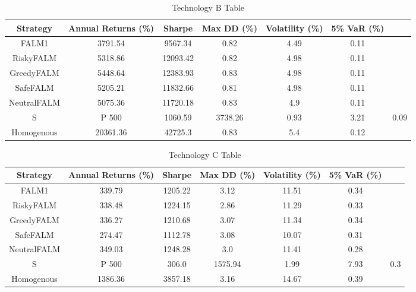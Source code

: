 \begin{table}[]
    \centering
    \caption{Technology B Table}
    \begin{tabular}{|c|c|c|c|c|c|c|}
        \hline
        Strategy & Annual Returns (\%) & Sharpe & Max \ac{DD} (\%) & Volatility (\%)& 5\% \ac{VaR} (\%) \\
        \hline
        FALM1 & 3791.54 & 9567.34 & 0.82 & 4.49 & 0.11 \\
        RiskyFALM & 5318.86 & 12093.42 & 0.82 & 4.98 & 0.11 \\
        GreedyFALM & 5448.64 & 12383.93 & 0.83 & 4.98 & 0.11 \\
        SafeFALM & 5205.21 & 11832.66 & 0.81 & 4.98 & 0.11 \\
        NeutralFALM & 5075.36 & 11720.18 & 0.83 & 4.9 & 0.11 \\
        S&P 500 & 1060.59 & 3738.26 & 0.93 & 3.21 & 0.09 \\
        Homogenous & 20361.36 & 42725.3 & 0.83 & 5.4 & 0.12 \\
        \hline
    \end{tabular}
    \label{tab:technology_b_table}
\end{table}

\begin{table}[]
    \centering
    \caption{Technology C Table}
    \begin{tabular}{|c|c|c|c|c|c|c|}
        \hline
        Strategy & Annual Returns (\%) & Sharpe & Max \ac{DD} (\%) & Volatility (\%)& 5\% \ac{VaR} (\%) \\
        \hline
        FALM1 & 339.79 & 1205.22 & 3.12 & 11.51 & 0.34 \\
        RiskyFALM & 338.48 & 1224.15 & 2.86 & 11.29 & 0.33 \\
        GreedyFALM & 336.27 & 1210.68 & 3.07 & 11.34 & 0.34 \\
        SafeFALM & 274.47 & 1112.78 & 3.08 & 10.07 & 0.31 \\
        NeutralFALM & 349.03 & 1248.28 & 3.0 & 11.41 & 0.28 \\
        S&P 500 & 306.0 & 1575.94 & 1.99 & 7.93 & 0.3 \\
        Homogenous & 1386.36 & 3857.18 & 3.16 & 14.67 & 0.39 \\
        \hline
    \end{tabular}
    \label{tab:technology_c_table}
\end{table}

